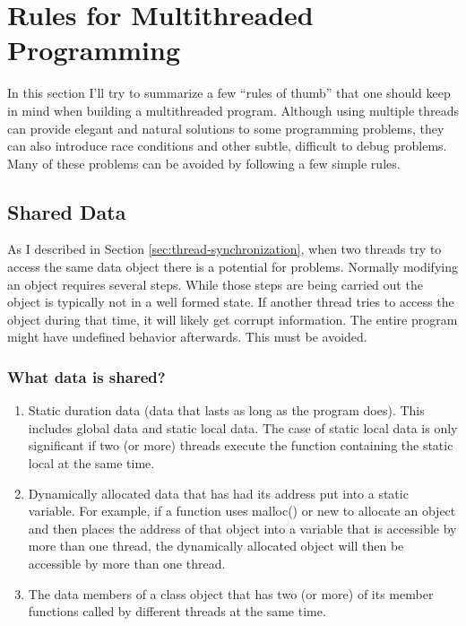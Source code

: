 
\section{Rules for Multithreaded Programming}
\label{sec:rules}

In this section I'll try to summarize a few ``rules of thumb'' that one should keep in mind when
building a multithreaded program. Although using multiple threads can provide elegant and
natural solutions to some programming problems, they can also introduce race conditions and
other subtle, difficult to debug problems. Many of these problems can be avoided by following a
few simple rules.

\subsection{Shared Data}

As I described in Section \ref{sec:thread-synchronization}, when two threads try to access the
same data object there is a potential for problems. Normally modifying an object requires
several steps. While those steps are being carried out the object is typically not in a well
formed state. If another thread tries to access the object during that time, it will likely get
corrupt information. The entire program might have undefined behavior afterwards. This must be
avoided.

\subsubsection{What data is shared?}

\begin{enumerate}

\item Static duration data (data that lasts as long as the program does). This includes global
  data and static local data. The case of static local data is only significant if two (or more)
  threads execute the function containing the static local at the same time.

\item Dynamically allocated data that has had its address put into a static variable. For
  example, if a function uses malloc() or new to allocate an object and then places the address
  of that object into a variable that is accessible by more than one thread, the dynamically
  allocated object will then be accessible by more than one thread.

\item The data members of a class object that has two (or more) of its member functions called
  by different threads at the same time.
   
\end{enumerate}

